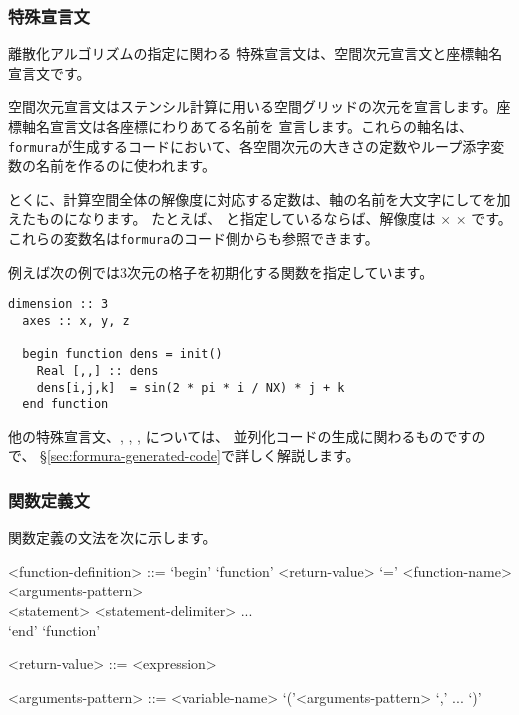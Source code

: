 \documentclass{jsarticle}
\newcommand{\formura}{{\texttt{formura}}}
\begin{document}
\subsubsection{特殊宣言文}

離散化アルゴリズムの指定に関わる
特殊宣言文は、空間次元宣言文と座標軸名宣言文です。

空間次元宣言文はステンシル計算に用いる空間グリッドの次元を宣言します。座標軸名宣言文は各座標にわりあてる名前を
宣言します。これらの軸名は、\formura が生成するコードにおいて、各空間次元の大きさの定数やループ添字変数の名前を作るのに使われます。

とくに、計算空間全体の解像度に対応する定数は、軸の名前を大文字にしてを加えたものになります。
たとえば、
と指定しているならば、解像度は
×
×
です。これらの変数名は\formura のコード側からも参照できます。


例えば次の例では3次元の格子を初期化する関数を指定しています。

\begin{lstlisting}[mathescape]
  dimension :: 3
  axes :: x, y, z

  begin function dens = init()
    Real [,,] :: dens
    dens[i,j,k]  = sin(2 * pi * i / NX) * j + k
  end function
\end{lstlisting}

他の特殊宣言文、, , ,
    については、
並列化コードの生成に関わるものですので、
\S \ref{sec:formura-generated-code}で詳しく解説します。






\subsubsection{関数定義文}

関数定義の文法を次に示します。

\begin{grammar}
<function-definition> ::=
  `begin' `function' <return-value> `=' <function-name> <arguments-pattern> \\
\hspace{2em}<statement> <statement-delimiter> ...  \\
    `end' `function'

<return-value> ::= <expression>

<arguments-pattern>     ::= <variable-name>
                         \alt  `('<arguments-pattern>  `,' ... `)'
\end{grammar}
\end{document}
